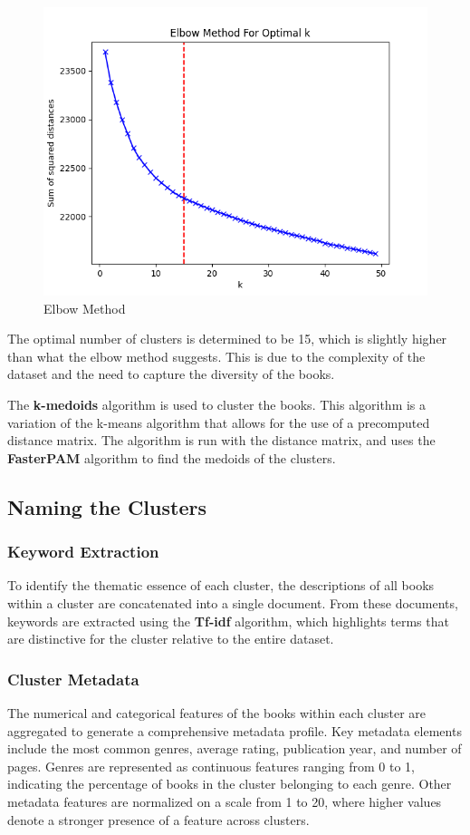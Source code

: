 \documentclass[english]{mvi-report}
\begin{document}
\begin{figure}[H]
    \centering
    \includegraphics[width=0.6\linewidth]{img/elbow_method.png}
    \caption{Elbow Method}
    \label{fig:elbow_method}
\end{figure}

The optimal number of clusters is determined to be 15, which is slightly higher than what the elbow method suggests. This is due to the complexity of the dataset and the need to capture the diversity of the books.

The \textbf{k-medoids} algorithm is used to cluster the books. This algorithm is a variation of the k-means algorithm that allows for the use of a precomputed distance matrix. The algorithm is run with the distance matrix, and uses the \textbf{FasterPAM} algorithm to find the medoids of the clusters.

\subsection{Naming the Clusters}
\subsubsection{Keyword Extraction}
To identify the thematic essence of each cluster, the descriptions of all books within a cluster are concatenated into a single document. From these documents, keywords are extracted using the \textbf{Tf-idf} algorithm, which highlights terms that are distinctive for the cluster relative to the entire dataset.

\subsubsection{Cluster Metadata}
The numerical and categorical features of the books within each cluster are aggregated to generate a comprehensive metadata profile. Key metadata elements include the most common genres, average rating, publication year, and number of pages. Genres are represented as continuous features ranging from 0 to 1, indicating the percentage of books in the cluster belonging to each genre. Other metadata features are normalized on a scale from 1 to 20, where higher values denote a stronger presence of a feature across clusters.
\end{document}
